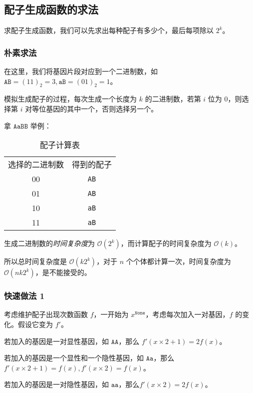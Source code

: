 \documentclass[12pt]{article} %
\begin{document}
\subsection{配子生成函数的求法}

求配子生成函数，我们可以先求出每种配子有多少个，最后每项除以 $2^k$。 

\subsubsection*{朴素求法}

在这里，我们将基因片段对应到一个二进制数，如 $\texttt{AB}=(11)_2=3,\texttt{aB}=(01)_2=1$。

模拟生成配子的过程，每次生成一个长度为 $k$ 的二进制数，若第 $i$ 位为 $0$，则选择第 $i$ 对等位基因的其中一个，否则选择另一个。

拿 $\texttt{AaBB}$ 举例：

\begin{table}[htbp]
    \centering
    \caption{配子计算表}
    \begin{tabular}{|c|c|}
        选择的二进制数 & 得到的配子 \\
        00 & \texttt{AB} \\
        01 & \texttt{AB} \\
        10 & \texttt{aB} \\
        11 & \texttt{aB} \\
    \end{tabular}
\end{table}

生成二进制数的\textsl{时间复杂度}为 $\mathcal O(2^k)$，而计算配子的时间复杂度为 $\mathcal O(k)$。

所以总时间复杂度是 $\mathcal O(k 2^k)$，对于 $n$ 个个体都计算一次，时间复杂度为 $\mathcal O(nk 2^k)$，是不能接受的。

\subsubsection*{快速做法 1}

考虑维护配子出现次数函数 $f$，一开始为 $x^{\texttt{None}}$，考虑每次加入一对基因，$f$ 的变化。假设它变为 $f'$。

若加入的基因是一对显性基因，如 $\texttt{AA}$，那么 $f'(x \times 2 + 1)=2f(x)$。

若加入的基因是一个显性和一个隐性基因，如 $\texttt{Aa}$，那么 $f'(x \times 2 + 1)=f(x),f'(x \times 2)=f(x)$。

若加入的基因是一对隐性基因，如 $\texttt{aa}$，那么$f'(x \times 2)=2f(x)$。
\end{document}
